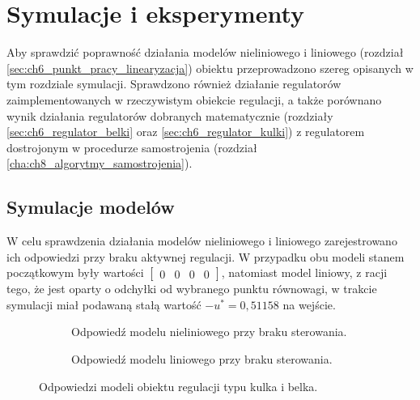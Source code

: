 \chapter{Symulacje i eksperymenty}
\label{cha:ch9_symulacje_i_eksperymenty}

Aby sprawdzić poprawność działania modelów nieliniowego i liniowego (rozdział \ref{sec:ch6_punkt_pracy_linearyzacja}) obiektu przeprowadzono szereg opisanych w tym rozdziale symulacji. Sprawdzono również działanie regulatorów zaimplementowanych w rzeczywistym obiekcie regulacji, a także porównano wynik działania regulatorów dobranych matematycznie (rozdziały \ref{sec:ch6_regulator_belki} oraz \ref{sec:ch6_regulator_kulki}) z regulatorem dostrojonym w procedurze samostrojenia (rozdział \ref{cha:ch8_algorytmy_samostrojenia}).

\section{Symulacje modelów}
\label{sec:ch9_symulacje_modelow}


W celu sprawdzenia działania modelów nieliniowego i liniowego zarejestrowano ich odpowiedzi przy braku aktywnej regulacji. W przypadku obu modeli stanem początkowym były wartości $\begin{bmatrix}
0 & 0 & 0 & 0
\end{bmatrix}$, natomiast model liniowy, z racji tego, że jest oparty o odchyłki od wybranego punktu równowagi, w trakcie symulacji miał podawaną stałą wartość $-u^*=0,51158$ na wejście.

\begin{sidewaysfigure}
    \centering
    \begin{subfigure}[b]{0.49\textwidth}
        
        \caption{Odpowiedź modelu nieliniowego przy braku sterowania.}
        \label{fig:odpowiedz_modelu_nieliniowego_brak_sterowania}
    \end{subfigure}
    \begin{subfigure}[b]{0.49\textwidth}
        
        \caption{Odpowiedź modelu liniowego przy braku sterowania.}
        \label{fig:odpowiedz_modelu_liniowego_brak_sterowania}
    \end{subfigure}
    
    \caption{Odpowiedzi modeli obiektu regulacji typu kulka i belka.}\label{fig:odpowiedzi_modeli}
\end{sidewaysfigure}

